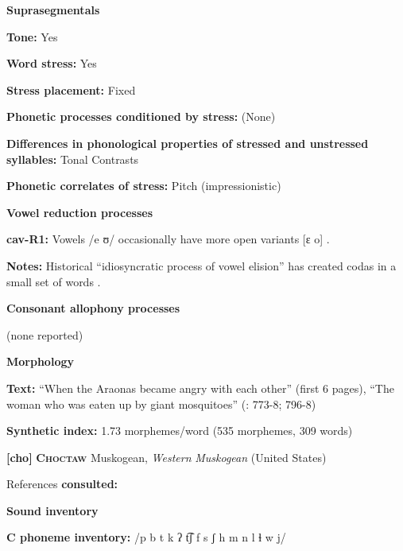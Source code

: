 \textbf{Suprasegmentals}



\textbf{Tone:} Yes



\textbf{Word stress:} Yes



\textbf{Stress placement:} Fixed



\textbf{Phonetic processes conditioned by stress:} (None)



\textbf{Differences in phonological properties of stressed and unstressed syllables:} Tonal Contrasts



\textbf{Phonetic correlates of stress:} Pitch (impressionistic)



\textbf{Vowel reduction processes}



\textbf{cav-R1:} Vowels /e ʊ/ occasionally have more open variants [ɛ o] \citep[29]{Guillaume2008}.



\textbf{Notes:} Historical “idiosyncratic process of vowel elision” has created codas in a small set of words \citep[29]{Guillaume2008}.



\textbf{Consonant allophony processes}



(none reported)



\textbf{Morphology}



\textbf{Text:} “When the Araonas became angry with each other” (first 6 pages), “The woman who was eaten up by giant mosquitoes” (\citealt{Guillaume2008}: 773-8; 796-8)



\textbf{Synthetic index:} 1.73 morphemes/word (535 morphemes, 309 words)



\textbf{[cho]}   \textbf{\textsc{Choctaw}}  Muskogean, \textit{Western} \textit{Muskogean} (United States)



References \textbf{consulted:} \citet{Broadwell2006}



\textbf{Sound inventory}



\textbf{C phoneme inventory:} /p b t k ʔ t͡ʃ f s ʃ h m n l ɬ w j/



